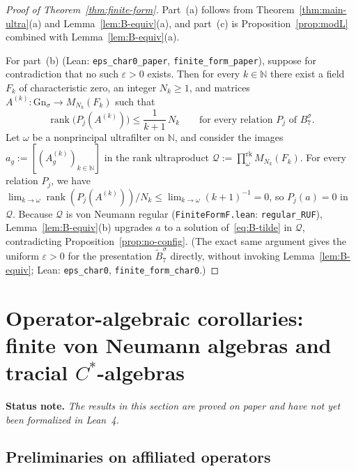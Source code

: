\documentclass[11pt]{article}
\theoremstyle{definition}
\theoremstyle{remark}
\numberwithin{equation}{section}
\DeclareMathOperator{\rank}{rank}
\newcommand{\RUF}[3]{\prod_{#1}^{\mathrm{rk}} M_{#2}(#3)}
\newcommand{\N}{\mathbb{N}}
\newcommand{\1}{\mathbf{1}}
\newcommand{\code}[1]{{\normalfont\small\texttt{#1}}}
\begin{document}
\begin{proof}[Proof of Theorem~\ref{thm:finite-form}]
Part~(a) follows from Theorem~\ref{thm:main-ultra}(a) and Lemma~\ref{lem:B-equiv}(a), and part~(c) is Proposition~\ref{prop:modL} combined with Lemma~\ref{lem:B-equiv}(a).

For part~(b) (Lean: \code{eps\_char0\_paper}, \code{finite\_form\_paper}), suppose for contradiction that no such $\varepsilon > 0$ exists. Then for every $k \in \N$ there exist a field $F_k$ of characteristic zero, an integer $N_k \ge 1$, and matrices $A^{(k)}\colon \mathrm{Gn}_\sigma \to M_{N_k}(F_k)$ such that
\[
\rank\bigl(P_j(A^{(k)})\bigr) \le \frac{1}{k + 1}\, N_k \qquad\text{for every relation } P_j \text{ of } B_7^\sigma.
\]
Let $\omega$ be a nonprincipal ultrafilter on $\N$, and consider the images $a_g := [(A^{(k)}_g)_{k \in \N}]$ in the rank ultraproduct $\mathcal{Q} := \RUF{\omega}{N_k}{F_k}$. For every relation $P_j$, we have $\lim_{k \to \omega} \rank(P_j(A^{(k)}))/N_k \le \lim_{k \to \omega} (k+1)^{-1} = 0$, so $P_j(a) = 0$ in $\mathcal{Q}$. Because $\mathcal{Q}$ is von Neumann regular (\code{FiniteFormF.lean}: \code{regular\_RUF}), Lemma~\ref{lem:B-equiv}(b) upgrades $a$ to a solution of~\eqref{eq:B-tilde} in $\mathcal{Q}$, contradicting Proposition~\ref{prop:no-config}. (The exact same argument gives the uniform $\varepsilon > 0$ for the presentation $\widetilde{B}_7^\sigma$ directly, without invoking Lemma~\ref{lem:B-equiv}; Lean: \code{eps\_char0}, \code{finite\_form\_char0}.)
\end{proof}

\section{Operator-algebraic corollaries: finite von Neumann algebras and tracial \texorpdfstring{$C^*$}{C*}-algebras}
\label{sec:vn}

\noindent\textbf{Status note.} \emph{The results in this section are proved on paper and have not yet been formalized in Lean~4.}

\subsection{Preliminaries on affiliated operators}
\end{document}

